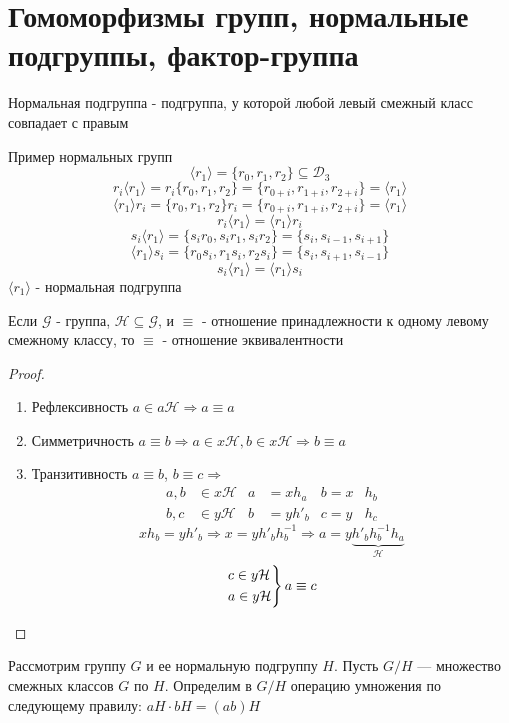 \documentclass[../main/document.tex]{subfiles}
\begin{document}
\section{Гомоморфизмы групп, нормальные подгруппы, фактор-группа}
\begin{dfn}
Нормальная подгруппа - подгруппа, у которой любой левый смежный класс совпадает с правым
\end{dfn}

\begin{exm}
Пример нормальных групп
$$\langle r_1\rangle=\{r_0,r_1,r_2\}\subseteq \mathcal{D}_3$$
$$r_i\langle r_1\rangle=r_i\{r_0,r_1,r_2\}=\{r_{0+i},r_{1+i},r_{2+i}\}=\langle r_1\rangle$$
$$\langle r_1\rangle r_i=\{r_0,r_1,r_2\}r_i=\{r_{0+i},r_{1+i},r_{2+i}\}=\langle r_1\rangle$$
$$r_i\langle r_1\rangle=\langle r_1\rangle r_i$$
$$s_i\langle r_1\rangle=\{s_ir_0,s_ir_1,s_ir_2\}=\{s_i,s_{i-1},s_{i+1}\}$$
$$\langle r_1\rangle s_i=\{r_0s_i,r_1s_i,r_2s_i\}=\{s_i,s_{i+1},s_{i-1}\}$$
$$s_i\langle r_1\rangle=\langle r_1\rangle s_i$$
$\langle r_1\rangle$ - нормальная подгруппа

\end{exm}

\begin{thm}
Если $\mathcal{G}$ - группа, $\mathcal{H}\subseteq \mathcal{G}$, и $\equiv$ - отношение принадлежности к одному левому смежному классу, то $\equiv$ - отношение эквивалентности
\begin{proof}
\begin{enumerate}
\item Рефлексивность $a\in a\mathcal{H}\Rightarrow a\equiv a$
\item Симметричность $a\equiv b\Rightarrow a \in x\mathcal{H}, b\in x\mathcal{H}\Rightarrow b\equiv a$
\item Транзитивность $a\equiv b$, $b\equiv c\Rightarrow $
\begin{align*}
a,b&\in x\mathcal{H} & a &=xh_a & b=x&h_b \\
b,c&\in y\mathcal{H} & b &=yh'_b & c=y&h_c 
\end{align*} 
$$xh_b=yh'_b\Rightarrow x=yh'_bh^{-1}_b\Rightarrow a=y\underbrace{h'_bh^{-1}_bh_a}_{\mathcal{H}}$$
$$
\begin{rcases}
c \in y\mathcal{H}\\
a\in y\mathcal{H}
\end{rcases}
a\equiv c
$$
\end{enumerate}
\end{proof}
\end{thm}
\begin{dfn}[Факторгруппа]
Рассмотрим группу $G$ и ее нормальную подгруппу $H$. Пусть $G/H$ — множество смежных классов $G$ по $H$. Определим в $G/H$ операцию умножения по следующему правилу: $aH\cdot bH=(ab)H$
\end{dfn}
\end{document}

